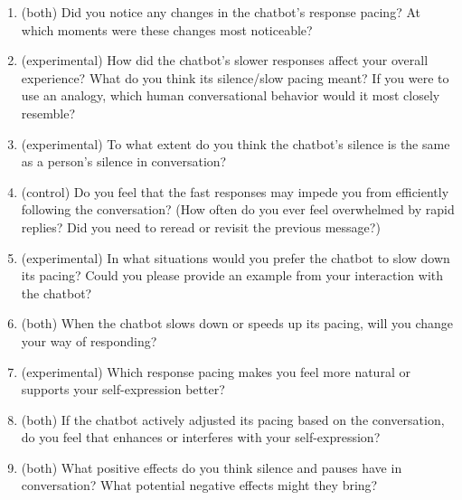     \begin{enumerate}
        \item (both) Did you notice any changes in the chatbot's response pacing? At which moments were these changes most noticeable? 
        \item (experimental) How did the chatbot's slower responses affect your overall experience? What do you think its silence/slow pacing meant? If you were to use an analogy, which human conversational behavior would it most closely resemble? 
        \item (experimental) To what extent do you think the chatbot's silence is the same as a person's silence in conversation? 
        \item (control) Do you feel that the fast responses may impede you from efficiently following the conversation? (How often do you ever feel overwhelmed by rapid replies? Did you need to reread or revisit the previous message?) 
        \item (experimental) In what situations would you prefer the chatbot to slow down its pacing? Could you please provide an example from your interaction with the chatbot?
        \item (both) When the chatbot slows down or speeds up its pacing, will you change your way of responding? 
        \item (experimental) Which response pacing makes you feel more natural or supports your self-expression better? 
        \item (both) If the chatbot actively adjusted its pacing based on the conversation, do you feel that enhances or interferes with your self-expression? 
        \item (both) What positive effects do you think silence and pauses have in conversation? What potential negative effects might they bring? 
    \end{enumerate}